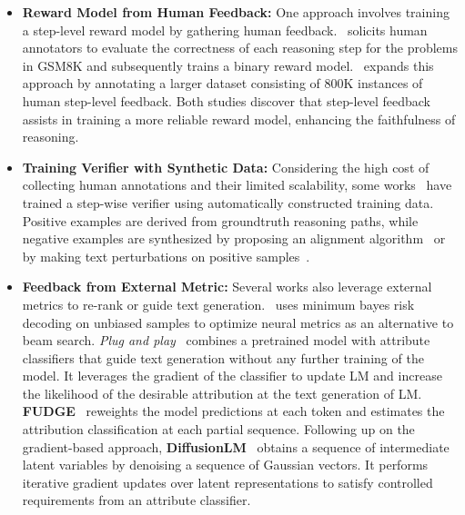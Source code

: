 \documentclass[12pt]{extarticle}
\begin{document}
\begin{itemize}
    \item \textbf{Reward Model from Human Feedback:} One approach involves training a step-level reward model by gathering human feedback.~\cite{uesato2022solving} solicits human annotators to evaluate the correctness of each reasoning step for the problems in GSM8K and subsequently trains a binary reward model.~\cite{lightman2023lets} expands this approach by annotating a larger dataset consisting of 800K instances of human step-level feedback. Both studies discover that step-level feedback assists in training a more reliable reward model, enhancing the faithfulness of reasoning.

    \item \textbf{Training Verifier with Synthetic Data:} Considering the high cost of collecting human annotations and their limited scalability, some works~\cite{yang-etal-2022-generating, tafjord-etal-2022-entailer, li-etal-2023-making, khalifa2023grace} have trained a step-wise verifier using automatically constructed training data. Positive examples are derived from groundtruth reasoning paths, while negative examples are synthesized by proposing an alignment algorithm~\cite{khalifa2023grace} or by making text perturbations on positive samples~\cite{yang-etal-2022-generating}.

    \item \textbf{Feedback from External Metric:} Several works also leverage external metrics to re-rank or guide text generation.~\cite{freitag-etal-2022-high} uses minimum bayes risk decoding on unbiased samples to optimize neural metrics as an alternative to beam search. \textit{Plug and play}~\cite{dathathri2020plug} combines a pretrained model with attribute classifiers that guide text generation without any further training of the model. It leverages the gradient of the classifier to update LM and increase the likelihood of the desirable attribution at the text generation of LM. \textbf{FUDGE}~\cite{yang-klein-2021-fudge} reweights the model predictions at each token and estimates the attribution classification at each partial sequence. Following up on the gradient-based approach, \textbf{DiffusionLM}~\cite{li2022diffusionlm} obtains a sequence of intermediate latent variables by denoising a sequence of Gaussian vectors. It performs iterative gradient updates over latent representations to satisfy controlled requirements from an attribute classifier.


\end{itemize}
\end{document}
